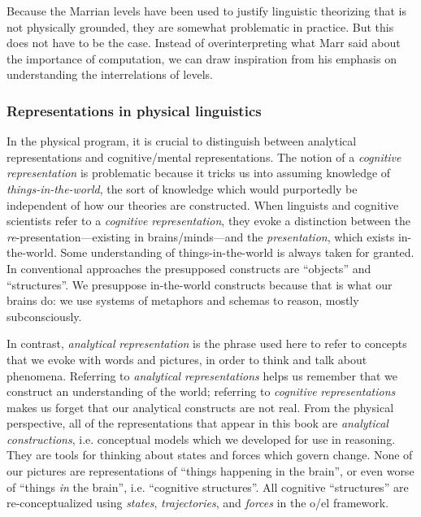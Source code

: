   Because the Marrian levels have been used to justify linguistic theorizing that is not physically grounded, they are somewhat problematic in practice. But this does not have to be the case. Instead of overinterpreting what Marr said about the importance of computation, we can draw inspiration from his emphasis on understanding the interrelations of levels. 

\subsubsection{Representations in physical linguistics}

In the physical program, it is crucial to distinguish between analytical representations and cognitive/mental representations. The notion of a \textit{cognitive} \textit{representation} is problematic because it tricks us into assuming knowledge of \textit{things-in-the-world}, the sort of knowledge which would purportedly be independent of how our theories are constructed. When linguists and cognitive scientists refer to a \textit{cognitive} \textit{representation}, they evoke a distinction between the \textit{re}{}-presentation—existing in brains/minds—and the \textit{presentation}, which exists in-the-world. Some understanding of things-in-the-world is always taken for granted. In conventional approaches the presupposed constructs are “objects” and “structures”. We presuppose in-the-world constructs because that is what our brains do: we use systems of metaphors and schemas to reason, mostly subconsciously. 

  In contrast, \textit{analytical} \textit{representation} is the phrase used here to refer to concepts that we evoke with words and pictures, in order to think and talk about phenomena. Referring to \textit{analytical} \textit{representations} helps us remember that we construct an understanding of the world; referring to \textit{cognitive} \textit{representations} makes us forget that our analytical constructs are not real. From the physical perspective, all of the representations that appear in this book are \textit{analytical} \textit{constructions}, i.e. conceptual models which we developed for use in reasoning. They are tools for thinking about states and forces which govern change. None of our pictures are representations of “things happening in the brain”, or even worse of “things \textit{in} the brain”, i.e. “cognitive structures”. All cognitive “structures” are re-conceptualized using \textit{states}, \textit{trajectories}, and \textit{forces} in the o/el framework. 

